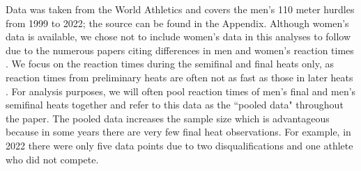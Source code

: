 \documentclass[12pt, letterpaper, titlepage]{article}
\newcommand{\eds}[1]{\textcolor{red}{EDS: (#1)}}
\newcommand{\of}[1]{\textcolor{violet}{OF: #1}}
\begin{document}
Data was taken from the World Athletics 
and covers the men's 110 meter hurdles from 1999 to 2022; the source can be 
found in the Appendix.%
Although women's data is available, we chose not to include women's data in this
analyses to follow due to the numerous papers citing differences in men and
women's reaction times \citep{lipps2011implications, babicc2009reaction,
panoutsakopoulos2020gender}.
We focus on the reaction times during the semifinal and final heats only, as 
reaction times from preliminary heats are often not as fast as those in later 
heats %
\citep[e.g.,][]{zhang2021correlation}. 
For analysis purposes, we will often pool reaction times of men's final and 
men's semifinal heats together and refer to this data as the ``pooled data"
throughout the paper.  %
The pooled data increases the sample size which is advantageous because in some
years there are very few final heat observations.  For example, in 2022 there
were only five data points due to two disqualifications and one athlete who 
did not compete.
\end{document}
